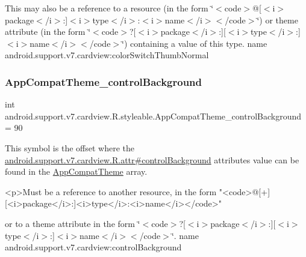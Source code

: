 This may also be a reference to a resource (in the form \char`\"{}$<$code$>$@\mbox{[}$<$i$>$package$<$/i$>$\+:\mbox{]}$<$i$>$type$<$/i$>$\+:$<$i$>$name$<$/i$>$$<$/code$>$\char`\"{}) or theme attribute (in the form \char`\"{}$<$code$>$?\mbox{[}$<$i$>$package$<$/i$>$\+:\mbox{]}\mbox{[}$<$i$>$type$<$/i$>$\+:\mbox{]}$<$i$>$name$<$/i$>$$<$/code$>$\char`\"{}) containing a value of this type.  name android.\+support.\+v7.\+cardview\+:color\+Switch\+Thumb\+Normal \mbox{\label{classandroid_1_1support_1_1v7_1_1cardview_1_1R_1_1styleable_aded076ba098cace6d5af80e46448b628}} 
\subsubsection{\texorpdfstring{App\+Compat\+Theme\+\_\+control\+Background}{AppCompatTheme\_controlBackground}}
{\footnotesize\ttfamily int android.\+support.\+v7.\+cardview.\+R.\+styleable.\+App\+Compat\+Theme\+\_\+control\+Background = 90\hspace{0.3cm}{\ttfamily [static]}}

This symbol is the offset where the \hyperlink{classandroid_1_1support_1_1v7_1_1cardview_1_1R_1_1attr_a9788ead14036f93aa243770c842b1fd0}{android.\+support.\+v7.\+cardview.\+R.\+attr\#control\+Background} attribute\textquotesingle{}s value can be found in the \hyperlink{classandroid_1_1support_1_1v7_1_1cardview_1_1R_1_1styleable_a52e6f69f954ecc2622d72c0b4d298938}{App\+Compat\+Theme} array.

\begin{DoxyVerb}      <p>Must be a reference to another resource, in the form "<code>@[+][<i>package</i>:]<i>type</i>:<i>name</i></code>"
\end{DoxyVerb}
 or to a theme attribute in the form \char`\"{}$<$code$>$?\mbox{[}$<$i$>$package$<$/i$>$\+:\mbox{]}\mbox{[}$<$i$>$type$<$/i$>$\+:\mbox{]}$<$i$>$name$<$/i$>$$<$/code$>$\char`\"{}.  name android.\+support.\+v7.\+cardview\+:control\+Background \mbox{\label{classandroid_1_1support_1_1v7_1_1cardview_1_1R_1_1styleable_ae8501eb855f89c1202f5514c8347c99f}} 
